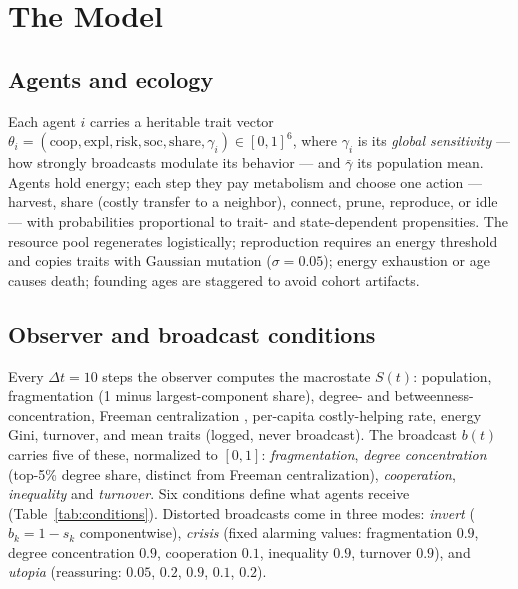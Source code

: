 \documentclass{svproc}
\begin{document}
\section{The Model}
\subsection{Agents and ecology}
Each agent $i$ carries a heritable trait vector
$\theta_i=(\mathrm{coop},\mathrm{expl},\mathrm{risk},\mathrm{soc},
\mathrm{share},\gamma_i)\in[0,1]^6$, where $\gamma_i$ is its
\emph{global sensitivity} --- how strongly broadcasts modulate its behavior ---
and $\bar\gamma$ its population mean.
Agents hold energy; each step they pay metabolism and choose one action ---
harvest, share (costly transfer to a neighbor), connect, prune, reproduce, or
idle --- with probabilities proportional to trait- and state-dependent
propensities. The resource pool regenerates logistically; reproduction requires an energy
threshold and copies traits with Gaussian mutation ($\sigma=0.05$); energy
exhaustion or age causes death; founding ages are staggered to avoid cohort
artifacts.

\subsection{Observer and broadcast conditions}
Every $\Delta t=10$ steps the observer computes the macrostate $S(t)$:
population, fragmentation (1 minus largest-component share), degree- and
betweenness-concentration, Freeman centralization \cite{freeman1978centrality},
per-capita costly-helping rate, energy Gini, turnover, and mean traits (logged,
never broadcast). The broadcast $b(t)$ carries five of these, normalized to
$[0,1]$: \emph{fragmentation}, \emph{degree concentration} (top-5\% degree
share, distinct from Freeman centralization), \emph{cooperation},
\emph{inequality} and \emph{turnover}. Six conditions
define what agents receive (Table~\ref{tab:conditions}). Distorted broadcasts come in three modes:
\emph{invert} ($b_k = 1-s_k$ componentwise), \emph{crisis} (fixed alarming
values: fragmentation $0.9$, degree concentration $0.9$, cooperation $0.1$,
inequality $0.9$, turnover $0.9$), and \emph{utopia} (reassuring: $0.05$,
$0.2$, $0.9$, $0.1$, $0.2$).
\end{document}
